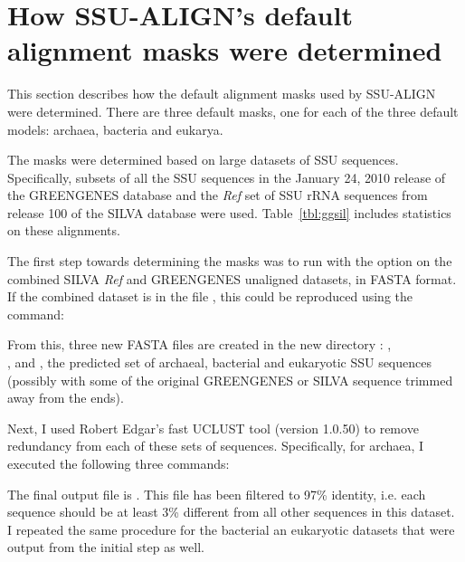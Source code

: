 \section{How SSU-ALIGN's default alignment masks were determined}
\label{sec:masks}

This section describes how the default alignment masks used by
SSU-ALIGN were determined. There are three default masks,
one for each of the three default models: archaea, bacteria and
eukarya.

The masks were determined based on large datasets
of SSU sequences. Specifically, subsets of all the SSU sequences in
the  January 24, 2010 release of the GREENGENES database 
\cite{DeSantis06} and the \emph{Ref} set of SSU rRNA sequences from
release 100 of the SILVA database
\cite{Pruesse07} were used. Table~\ref{tbl:ggsil} includes statistics
on these alignments. 

The first step towards determining the masks was to run
 with the  option on the combined
SILVA \emph{Ref} and GREENGENES unaligned
datasets, in FASTA format. If the combined dataset is in the file
, this could be reproduced using the command:


From this, three new FASTA files are created in the new directory
: , \\ ,
and , 
the predicted set of archaeal, bacterial and eukaryotic
SSU sequences (possibly with some of the original
GREENGENES or SILVA sequence trimmed away from
the ends). 

Next, I used Robert Edgar's fast UCLUST tool (version 1.0.50) to
remove redundancy from each of these sets of sequences. Specifically, for
archaea, I executed the following three  commands:




The final output file is . This file has
been filtered to 97\% identity, i.e. each sequence should be at least
3\% different from all other sequences in this dataset. I repeated the
same procedure for the bacterial an eukaryotic datasets that were
output from the initial  step as well.

